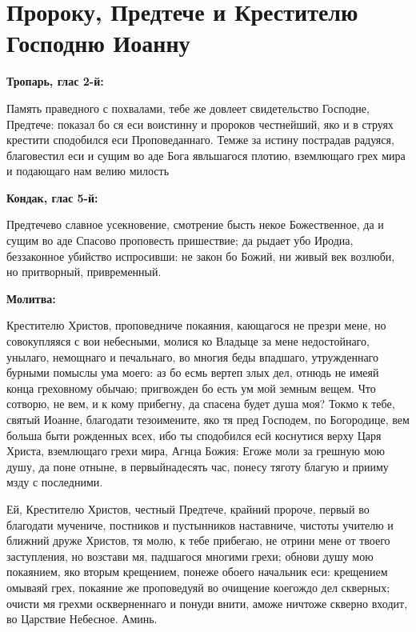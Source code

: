  
\vspace{-\baselineskip}
\section{Пророку, Предтече и Крестителю Господню Иоанну}
 


\bfseries Тропарь, глас 2-й:\normalfont{}\nopagebreak


Память праведного с похвалами, тебе же довлеет свидетельство Господне, Предтече: показал бо ся еси воистинну и пророков честнейший, яко и в струях крестити сподобился еси Проповеданнаго. Темже за истину пострадав радуяся, благовестил еси и сущим во аде Бога явльшагося плотию, вземлющаго грех мира и подающаго нам велию милость


\medskip


\bfseries Кондак, глас 5-й:\normalfont{}\nopagebreak


Предтечево славное усекновение, смотрение бысть некое Божественное, да и сущим во аде Спасово проповесть пришествие; да рыдает убо Иродиа, беззаконное убийство испросивши: не закон бо Божий, ни живый век возлюби, но притворный, привременный.


\medskip


\bfseries Молитва:\normalfont{}\nopagebreak


Крестителю Христов, проповедниче покаяния, кающагося не презри мене, но совокупляяся с вои небесными, молися ко Владыце за мене недостойнаго, унылаго, немощнаго и печальнаго, во многия беды впадшаго, утружденнаго бурными помыслы ума моего: аз бо есмь вертеп злых дел, отнюдь не имеяй конца греховному обычаю; пригвожден бо есть ум мой земным вещем. Что сотворю, не вем, и к кому прибегну, да спасена будет душа моя? Токмо к тебе, святый Иоанне, благодати тезоимените, яко тя пред Господем, по Богородице, вем больша быти рожденных всех, ибо ты сподобился есй коснутися верху Царя Христа, вземлющаго грехи мира, Агнца Божия: Егоже моли за грешную мою душу, да поне отныне, в первыйнадесять час, понесу тяготу благую и прииму мзду с последними.


Ей, Крестителю Христов, честный Предтече, крайний пророче, первый во благодати мучениче, постников и пустынников наставниче, чистоты учителю и ближний друже Христов, тя молю, к тебе прибегаю, не отрини мене от твоего заступления, но возстави мя, падшагося многими грехи; обнови душу мою покаянием, яко вторым крещением, понеже обоего начальник еси: крещением омываяй грех, покаяние же проповедуяй во очищение коегождо дел скверных; очисти мя грехми оскверненнаго и понуди внити, аможе ничтоже скверно входит, во Царствие Небесное. Аминь.


